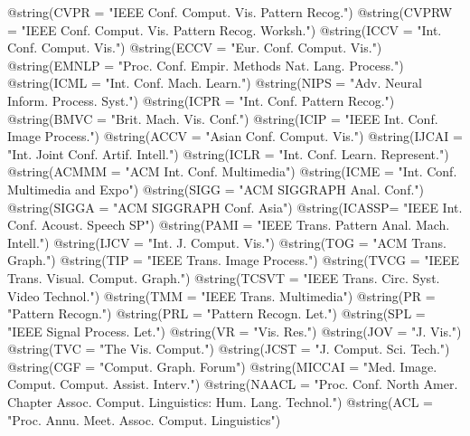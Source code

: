 @string(CVPR  = "{IEEE Conf. Comput. Vis. Pattern Recog.}")
@string(CVPRW = "{IEEE Conf. Comput. Vis. Pattern Recog. Worksh.}")
@string(ICCV  = "{Int. Conf. Comput. Vis.}")
@string(ECCV  = "{Eur. Conf. Comput. Vis.}")
@string(EMNLP  = "{Proc. Conf. Empir. Methods Nat. Lang. Process.}")
@string(ICML  = "{Int. Conf. Mach. Learn.}")
@string(NIPS  = "{Adv. Neural Inform. Process. Syst.}")
@string(ICPR  = "{Int. Conf. Pattern Recog.}")
@string(BMVC  = "{Brit. Mach. Vis. Conf.}")
@string(ICIP  = "{IEEE Int. Conf. Image Process.}")
@string(ACCV  = "{Asian Conf. Comput. Vis.}")
@string(IJCAI = "{Int. Joint Conf. Artif. Intell.}")
@string(ICLR  = "{Int. Conf. Learn. Represent.}")
@string(ACMMM = "{ACM Int. Conf. Multimedia}")
@string(ICME  = "{Int. Conf. Multimedia and Expo}")
@string(SIGG  = "{ACM SIGGRAPH Anal. Conf.}")
@string(SIGGA = "{ACM SIGGRAPH Conf. Asia}")
@string(ICASSP=	"{IEEE Int. Conf. Acoust. Speech SP}")
@string(PAMI  = "{IEEE Trans. Pattern Anal. Mach. Intell.}")
@string(IJCV  = "{Int. J. Comput. Vis.}")
@string(TOG   = "{ACM Trans. Graph.}")
@string(TIP   = "{IEEE Trans. Image Process.}")
@string(TVCG  = "{IEEE Trans. Visual. Comput. Graph.}")
@string(TCSVT = "{IEEE Trans. Circ. Syst. Video Technol.}")
@string(TMM   = "{IEEE Trans. Multimedia}")
@string(PR    = "{Pattern Recogn.}")
@string(PRL    = "{Pattern Recogn. Let.}")
@string(SPL	  = "{IEEE Signal Process. Let.}")
@string(VR    = "{Vis. Res.}")
@string(JOV	  = "{J. Vis.}")
@string(TVC   = "{The Vis. Comput.}")
@string(JCST  = "{J. Comput. Sci. Tech.}")
@string(CGF   = "{Comput. Graph. Forum}")
@string(MICCAI   = "{Med. Image. Comput. Comput. Assist. Interv.}")
@string(NAACL = "{Proc. Conf. North Amer. Chapter Assoc. Comput. Linguistics: Hum. Lang. Technol.}")
@string(ACL   = "{Proc. Annu. Meet. Assoc. Comput. Linguistics}")

